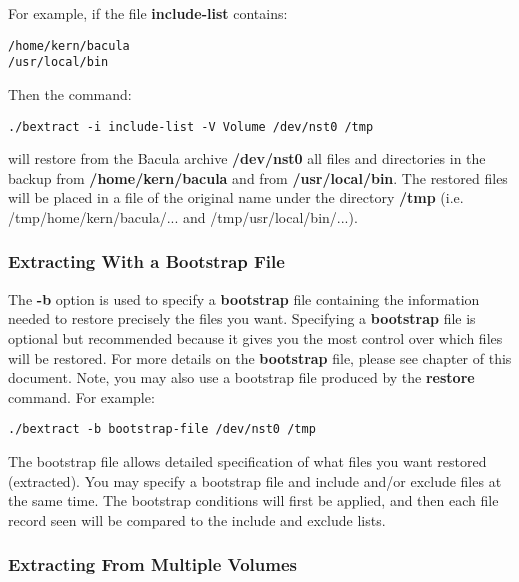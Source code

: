 For example, if the file {\bf include-list} contains: 

\footnotesize
\begin{verbatim}
/home/kern/bacula
/usr/local/bin
\end{verbatim}
\normalsize

Then the command: 

\footnotesize
\begin{verbatim}
./bextract -i include-list -V Volume /dev/nst0 /tmp
\end{verbatim}
\normalsize

will restore from the Bacula archive {\bf /dev/nst0} all files and directories
in the backup from {\bf /home/kern/bacula} and from {\bf /usr/local/bin}. The
restored files will be placed in a file of the original name under the
directory {\bf /tmp} (i.e. /tmp/home/kern/bacula/... and
/tmp/usr/local/bin/...). 

\subsubsection*{Extracting With a Bootstrap File}

The {\bf -b} option is used to specify a {\bf bootstrap} file containing the
information needed to restore precisely the files you want. Specifying a {\bf
bootstrap} file is optional but recommended because it gives you the most
control over which files will be restored. For more details on the {\bf
bootstrap} file, please see 
chapter of this document. Note, you may also use a bootstrap file produced by
the {\bf restore} command. For example: 

\footnotesize
\begin{verbatim}
./bextract -b bootstrap-file /dev/nst0 /tmp
\end{verbatim}
\normalsize

The bootstrap file allows detailed specification of what files you want
restored (extracted). You may specify a bootstrap file and include and/or
exclude files at the same time. The bootstrap conditions will first be
applied, and then each file record seen will be compared to the include and
exclude lists. 

\subsubsection*{Extracting From Multiple Volumes}

